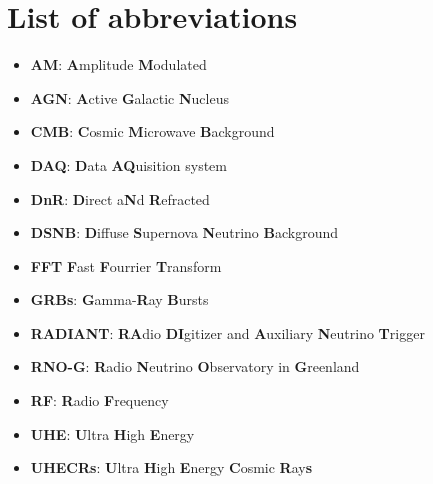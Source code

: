 \documentclass[11pt,a4paper,faculty=we,language=en,doctype=report]{cls/ugent-doc}
\begin{document}
\chapter{List of abbreviations}
\begin{itemize}
\item \textbf{AM}: \textbf{A}mplitude \textbf{M}odulated
\item \textbf{AGN}: \textbf{A}ctive \textbf{G}alactic \textbf{N}ucleus
\item \textbf{CMB}: \textbf{C}osmic \textbf{M}icrowave \textbf{B}ackground
\item \textbf{DAQ}: \textbf{D}ata \textbf{AQ}uisition system
\item \textbf{DnR}: \textbf{D}irect a\textbf{N}d \textbf{R}efracted
\item \textbf{DSNB}: \textbf{D}iffuse \textbf{S}upernova \textbf{N}eutrino \textbf{B}ackground
\item \textbf{FFT} \textbf{F}ast \textbf{F}ourrier \textbf{T}ransform
\item \textbf{GRBs}: \textbf{G}amma-\textbf{R}ay \textbf{B}ursts
\item \textbf{RADIANT}: \textbf{RA}dio \textbf{DI}gitizer and \textbf{A}uxiliary \textbf{N}eutrino \textbf{T}rigger
\item \textbf{RNO-G}: \textbf{R}adio \textbf{N}eutrino \textbf{O}bservatory in \textbf{G}reenland
\item \textbf{RF}: \textbf{R}adio \textbf{F}requency
\item \textbf{UHE}: \textbf{U}ltra \textbf{H}igh \textbf{E}nergy 
\item \textbf{UHECRs}: \textbf{U}ltra \textbf{H}igh \textbf{E}nergy \textbf{C}osmic \textbf{R}ay\textbf{s}
\end{itemize}
\end{document}
